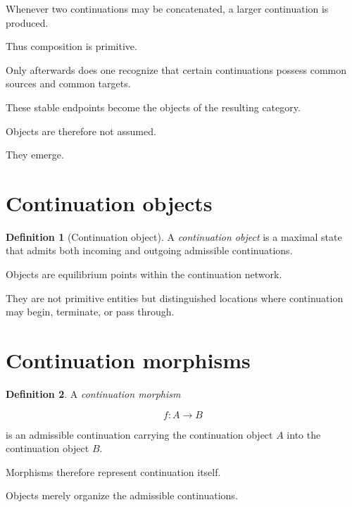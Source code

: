 \documentclass[13pt,openany]{book}
\theoremstyle{plain}
\theoremstyle{definition}
\newtheorem{definition}{Definition}[chapter]
\begin{document}
Whenever two continuations may be concatenated, a larger continuation is
produced.

Thus composition is primitive.

Only afterwards does one recognize that certain continuations possess common
sources and common targets.

These stable endpoints become the objects of the resulting category.

Objects are therefore not assumed.

They emerge.

\section{Continuation objects}

\begin{definition}[Continuation object]

A \emph{continuation object} is a maximal state that admits both incoming and
outgoing admissible continuations.

\end{definition}

Objects are equilibrium points within the continuation network.

They are not primitive entities but distinguished locations where continuation
may begin, terminate, or pass through.

\section{Continuation morphisms}

\begin{definition}

A \emph{continuation morphism}

\[
f:A\rightarrow B
\]

is an admissible continuation carrying the continuation object \(A\) into the
continuation object \(B\).

\end{definition}

Morphisms therefore represent continuation itself.

Objects merely organize the admissible continuations.
\end{document}
